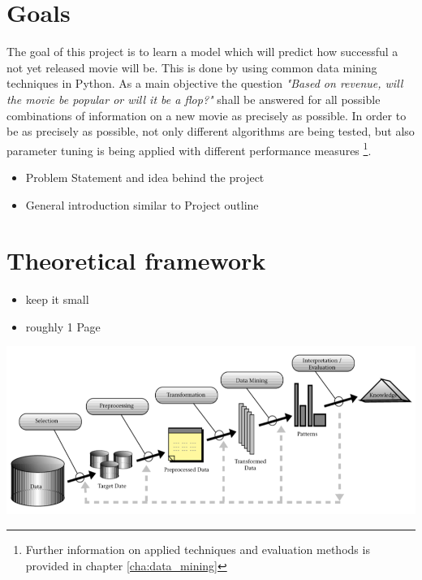 \section{Goals}
The goal of this project is to learn a model which will predict how successful a not yet released movie will be. This is done by using common data mining techniques in Python. As a main objective the question \textit{"Based on revenue, will the movie be popular or will it be a flop?"} shall be answered for all possible combinations of information on a new movie as precisely as possible.
In order to be as precisely as possible, not only different algorithms are being tested, but also parameter tuning is being applied with different performance measures \footnote{Further information on applied techniques and evaluation methods is provided in chapter \ref{cha:data_mining}}.


\begin{itemize}
	\item Problem Statement and idea behind the project
	\item General introduction similar to Project outline
\end{itemize}

\section{Theoretical framework}
\begin{itemize}
	\item keep it small
	\item roughly 1 Page
\end{itemize}
\includegraphics[width=\textwidth]{images/DM_Process.png}










